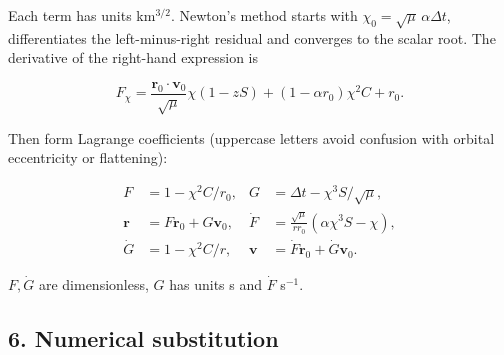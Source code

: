 \documentclass[10pt,a4paper]{article}
\numberwithin{equation}{section}
\begin{document}
\begin{sloppypar}Each term has units km\(^{3/2}\). Newton's method starts with \(\chi_0=\sqrt\mu\,\alpha\Delta t\), differentiates the left-minus-right residual and converges to the scalar root. The derivative of the right-hand expression is\end{sloppypar}


\begin{equation}F_\chi=\frac{\mathbf r_0\cdot\mathbf v_0}{\sqrt\mu}\chi(1-zS)
+(1-\alpha r_0)\chi^2C+r_0.\label{eq:ch2-10}\end{equation}

\begin{sloppypar}Then form Lagrange coefficients (uppercase letters avoid confusion with orbital eccentricity or flattening):\end{sloppypar}


\begin{equation}\begin{aligned}
F&=1-\chi^2C/r_0,&G&=\Delta t-\chi^3S/\sqrt\mu,\\
\mathbf r&=F\mathbf r_0+G\mathbf v_0,&
\dot F&=\frac{\sqrt\mu}{rr_0}(\alpha\chi^3S-\chi),\\
\dot G&=1-\chi^2C/r,&\mathbf v&=\dot F\mathbf r_0+\dot G\mathbf v_0.
\end{aligned}\label{eq:ch2-11}\end{equation}

\begin{sloppypar}\(F,\dot G\) are dimensionless, \(G\) has units s and \(\dot F\) s\(^{-1}\).\end{sloppypar}


\subsection*{6. Numerical substitution}
\end{document}

